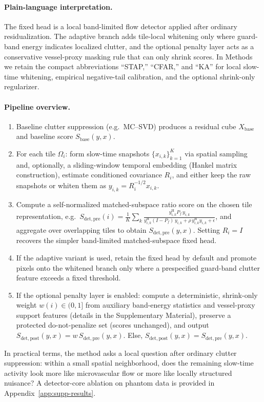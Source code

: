 \documentclass[11pt]{article}
\newcommand{\Hh}{^{\mathrm{H}}}
\newcommand{\Pf}{P_f}
\newif\ifSTAPPAPERONLY
\newcommand{\SuppOrApp}[1]{\ifSTAPPAPERONLY Supplementary Material\else Appendix~\ref{#1}\fi}
\begin{document}
\paragraph{Plain-language interpretation.}
The fixed head is a local band-limited flow detector applied after ordinary residualization. The adaptive branch adds tile-local whitening only where guard-band energy indicates localized clutter, and the optional penalty layer acts as a conservative vessel-proxy masking rule that can only shrink scores. In Methods we retain the compact abbreviations ``STAP,'' ``CFAR,'' and ``KA'' for local slow-time whitening, empirical negative-tail calibration, and the optional shrink-only regularizer.

\paragraph{Pipeline overview.}
\begin{enumerate}[nosep,leftmargin=1.6em,label=\arabic*.]
  \item Baseline clutter suppression (e.g.\ MC--SVD) produces a residual cube $X_{\mathrm{base}}$ and baseline score $S_{\mathrm{base}}(y,x)$.
  \item For each tile $\Omega_i$: form slow-time snapshots $\{x_{i,k}\}_{k=1}^K$ via spatial sampling and, optionally, a sliding-window temporal embedding (Hankel matrix construction), estimate conditioned covariance $R_i$, and either keep the raw snapshots or whiten them as $y_{i,k}=R_i^{-1/2}x_{i,k}$.
  \item Compute a self-normalized matched-subspace ratio score on the chosen tile representation, e.g.\ $S_{\mathrm{det,pre}}(i)=\frac{1}{K}\sum_k \frac{y_{i,k}\Hh \Pf\, y_{i,k}}{y_{i,k}\Hh (I-\Pf)\, y_{i,k}+\rho\, y_{i,k}\Hh y_{i,k}+\epsilon}$, and aggregate over overlapping tiles to obtain $S_{\mathrm{det,pre}}(y,x)$. Setting $R_i=I$ recovers the simpler band-limited matched-subspace fixed head.
  \item If the adaptive variant is used, retain the fixed head by default and promote pixels onto the whitened branch only where a prespecified guard-band clutter feature exceeds a fixed threshold.
  \item If the optional penalty layer is enabled: compute a deterministic, shrink-only weight $w(i)\in(0,1]$ from auxiliary band-energy statistics and vessel-proxy support features (details in the Supplementary Material), preserve a protected do-not-penalize set (scores unchanged), and output $S_{\mathrm{det,post}}(y,x)=w\,S_{\mathrm{det,pre}}(y,x)$. Else, $S_{\mathrm{det,post}}(y,x)=S_{\mathrm{det,pre}}(y,x)$.
\end{enumerate}
\noindent In practical terms, the method asks a local question after ordinary clutter suppression: within a small spatial neighborhood, does the remaining slow-time activity look more like microvascular flow or more like locally structured nuisance? A detector-core ablation on phantom data is provided in \SuppOrApp{app:supp-results}.
\end{document}
